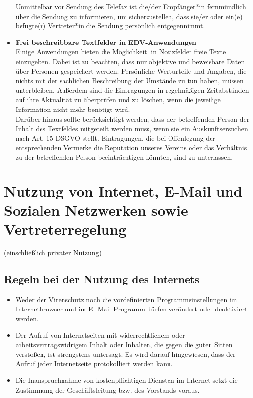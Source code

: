 \documentclass[a4paper, fontsize=11pt]{scrartcl}
\begin{document}
\begin{itemize}
  Unmittelbar vor Sendung des Telefax ist die/der Empfänger*in fernmündlich über die Sendung zu informieren, um sicherzustellen, dass sie/er oder ein(e) befugte(r) Vertreter*in die Sendung persönlich entgegennimmt.
  \item \textbf{Frei beschreibbare Textfelder in EDV-Anwendungen} \\ Einige Anwendungen bieten die Möglichkeit, in Notizfelder freie Texte einzugeben.
  Dabei ist zu beachten, dass nur objektive und beweisbare Daten über Personen gespeichert werden. Persönliche Werturteile und Angaben, die nichts mit der sachlichen Beschreibung der Umstände zu tun haben, müssen unterbleiben. Außerdem sind die Eintragungen in regelmäßigen Zeitabständen auf ihre Aktualität zu überprüfen und zu löschen, wenn die jeweilige Information nicht mehr benötigt wird.\\
  Darüber hinaus sollte berücksichtigt werden, dass der betreffenden Person der Inhalt des Textfeldes mitgeteilt werden muss, wenn sie ein Auskunftsersuchen nach Art. 15 DSGVO stellt. Eintragungen, die bei Offenlegung der entsprechenden Vermerke die Reputation unseres Vereins oder das Verhältnis zu der betreffenden Person beeinträchtigen könnten, sind zu unterlassen.
\end{itemize}

\section{Nutzung von Internet, E-Mail und Sozialen Netzwerken sowie Vertreterregelung}
(einschließlich privater Nutzung)

\subsection{Regeln bei der Nutzung des Internets}
\begin{itemize}
  \item Weder der Virenschutz noch die vordefinierten Programmeinstellungen im Internetbrowser und im E- Mail-Programm dürfen verändert oder deaktiviert werden.
  \item Der Aufruf von Internetseiten mit widerrechtlichem oder arbeitsvertragswidrigem Inhalt oder Inhalten, die gegen die guten Sitten verstoßen, ist strengstens untersagt. Es wird darauf hingewiesen, dass der Aufruf jeder Internetseite protokolliert werden kann.
  \item Die Inanspruchnahme von kostenpflichtigen Diensten im Internet setzt die Zustimmung der Geschäftsleitung bzw. des Vorstands voraus.
\end{itemize}
\end{document}
